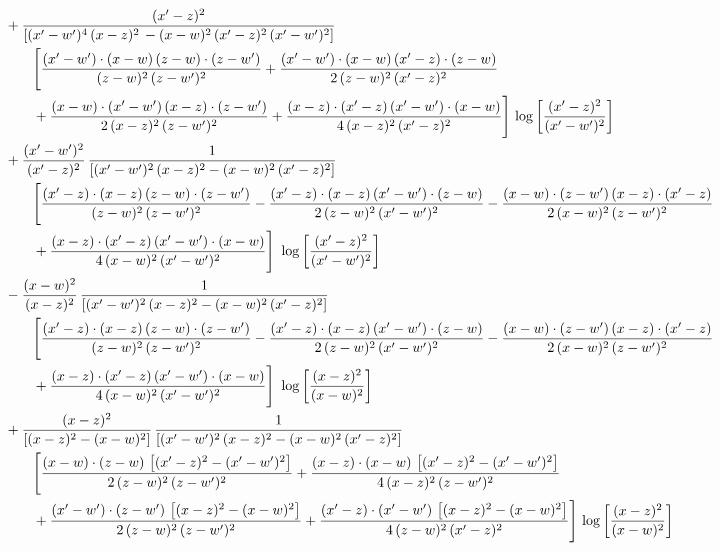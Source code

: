 \documentclass[10pt]{article}
\begin{document}
\begin{align}
&\qquad+\frac{(x^{\prime}-z)^{2}}{\left[(x^{\prime}-w^{\prime})^{4}\,(x-z)^{2}\, - (x-w)^{2}\, (x^{\prime}-z)^{2}\,(x^{\prime}-w^{\prime})^{2}\right]}\,  \notag\\&\qquad\qquad  \Bigg[\frac{(x^{\prime}-w^{\prime})\cdot (x-w)\, (z-w)\cdot (z-w^{\prime})}{(z-w)^{2}\, (z-w^{\prime})^{2}}+\frac{(x^{\prime}-w^{\prime})\cdot (x-w)\, (x^{\prime}-z)\cdot (z-w)}{2\, (z-w)^{2}\, (x^{\prime}-z)^{2}}\notag\\&\qquad\qquad  +\frac{(x-w)\cdot (x^{\prime}-w^{\prime})\, (x-z)\cdot (z-w^{\prime})}{2\, (x-z)^{2}\, (z-w^{\prime})^{2}}+\frac{(x-z)\cdot (x^{\prime}-z)\, (x^{\prime}-w^{\prime})\cdot (x-w)}{4\, (x-z)^{2}\, (x^{\prime}-z)^{2}}\Bigg] \,\log{\left[\frac{(x^{\prime}-z)^{2}}{(x^{\prime}-w^{\prime})^{2}}\right]}\notag\\
&\qquad+\frac{(x^{\prime}-w^{\prime})^{2}}{(x^{\prime}-z)^{2}}\, \frac{1}{\left[(x^{\prime}-w^{\prime})^{2}\, (x-z)^{2} - (x-w)^{2}\, (x^{\prime}-z)^{2}\right]} \notag\\&\qquad\qquad  \Bigg[\frac{(x^{\prime}-z)\cdot (x-z)\, (z-w)\cdot (z-w^{\prime})}{(z-w)^{2}\, (z-w^{\prime})^{2}}-\frac{(x^{\prime}-z)\cdot (x-z)\, (x^{\prime}-w^{\prime})\cdot (z-w)}{2\, (z-w)^{2}\, (x^{\prime}-w^{\prime})^{2}} -\frac{(x-w)\cdot (z-w^{\prime})\, (x-z)\cdot (x^{\prime}-z)}{2\, (x-w)^{2}\, (z-w^{\prime})^{2}}\notag\\&\qquad\qquad  +\frac{(x-z)\cdot (x^{\prime}-z)\, (x^{\prime}-w^{\prime})\cdot (x-w)}{4\, (x-w)^{2}\, (x^{\prime}-w^{\prime})^{2}}\Bigg]\,\, \log{\left[\frac{(x^{\prime}-z)^{2}}{(x^{\prime}-w^{\prime})^{2}}\right]}\notag\\
&\qquad-\frac{(x-w)^{2}}{(x-z)^{2}}\, \frac{1}{\left[(x^{\prime}-w^{\prime})^{2}\, (x-z)^{2} - (x-w)^{2}\, (x^{\prime}-z)^{2}\right]} \notag\\&\qquad\qquad  \Bigg[\frac{(x^{\prime}-z)\cdot (x-z)\, (z-w)\cdot (z-w^{\prime})}{(z-w)^{2}\, (z-w^{\prime})^{2}}-\frac{(x^{\prime}-z)\cdot (x-z)\, (x^{\prime}-w^{\prime})\cdot (z-w)}{2\, (z-w)^{2}\, (x^{\prime}-w^{\prime})^{2}} -\frac{(x-w)\cdot (z-w^{\prime})\, (x-z)\cdot (x^{\prime}-z)}{2\, (x-w)^{2}\, (z-w^{\prime})^{2}}\notag\\&\qquad\qquad  +\frac{(x-z)\cdot (x^{\prime}-z)\, (x^{\prime}-w^{\prime})\cdot (x-w)}{4\, (x-w)^{2}\, (x^{\prime}-w^{\prime})^{2}}\Bigg]\,\, \log{\left[\frac{(x-z)^{2}}{(x-w)^{2}}\right]}\notag\\
&\qquad+\frac{(x-z)^{2}}{\left[(x-z)^{2}-(x-w)^{2}\right]}\,\frac{1}{\left[(x^{\prime}-w^{\prime})^{2}\,(x-z)^{2} - (x-w)^{2}\,(x^{\prime}-z)^{2}\right]}\notag\\&\qquad\qquad  \Bigg[\frac{(x-w)\cdot (z-w)\, \left[(x^{\prime}-z)^{2}-(x^{\prime}-w^{\prime})^{2}\right]}{2\, (z-w)^{2}\, (z-w^{\prime})^{2}}  + \frac{(x-z)\cdot (x-w)\,\left[(x^{\prime}-z)^{2}-(x^{\prime}-w^{\prime})^{2}\right] }{4\,(x-z)^{2}\,(z-w^{\prime})^{2}}\notag\\&\qquad\qquad  +\frac{(x^{\prime}-w^{\prime})\cdot (z-w^{\prime})\, \left[(x-z)^{2}-(x-w)^{2}\right]}{2\, (z-w)^{2}\, (z-w^{\prime})^{2}}+ \frac{(x^{\prime}-z)\cdot (x^{\prime}-w^{\prime})\, \left[(x-z)^{2}-(x-w)^{2}\right]}{4\, (z-w)^{2}\,(x^{\prime}-z)^{2}}\Bigg]\, \log{\left[\frac{(x-z)^{2}}{(x-w)^{2}}\right]}\notag\\

\end{align}
\end{document}
